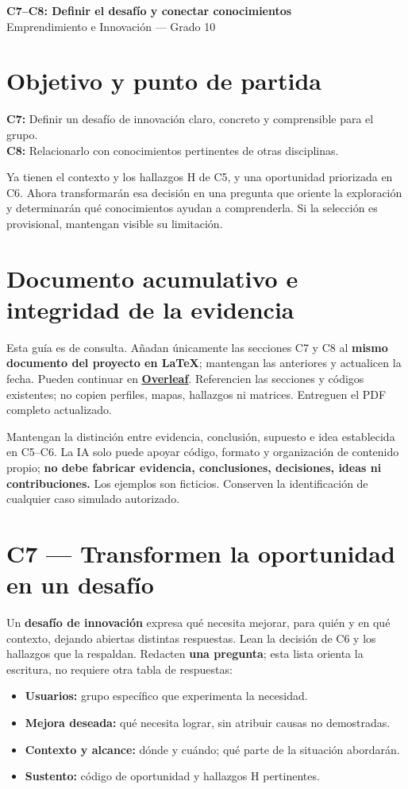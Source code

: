 \documentclass[12pt,a4paper]{article}
\newcommand{\guidelink}[2]{\href{#1}{\textcolor{LinkColor}{\textbf{\underline{#2}}}}}
\newcommand{\instruction}[1]{\textcolor{InstructionColor}{\textbf{#1}}}
\newcommand{\concept}[1]{\textcolor{ConceptColor}{\textbf{#1}}}
\begin{document}
\begin{center}
{\Large\bfseries\color{HeadingColor} C7--C8: Definir el desafío y conectar conocimientos}\\[3pt]
Emprendimiento e Innovación --- Grado 10
\end{center}

\section*{Objetivo y punto de partida}
\concept{C7:} Definir un desafío de innovación claro, concreto y comprensible para el grupo.\\
\concept{C8:} Relacionarlo con conocimientos pertinentes de otras disciplinas.

Ya tienen el contexto y los hallazgos H de C5, y una oportunidad priorizada en C6. Ahora transformarán esa decisión en una pregunta que oriente la exploración y determinarán qué conocimientos ayudan a comprenderla. Si la selección es provisional, mantengan visible su limitación.

\section*{Documento acumulativo e integridad de la evidencia}
Esta guía es de consulta. Añadan únicamente las secciones C7 y C8 al \textbf{mismo documento del proyecto en LaTeX}; mantengan las anteriores y actualicen la fecha. Pueden continuar en \guidelink{https://www.overleaf.com/}{Overleaf}. Referencien las secciones y códigos existentes; no copien perfiles, mapas, hallazgos ni matrices. Entreguen el PDF completo actualizado.

Mantengan la distinción entre evidencia, conclusión, supuesto e idea establecida en C5--C6. La IA solo puede apoyar código, formato y organización de contenido propio; \instruction{no debe fabricar evidencia, conclusiones, decisiones, ideas ni contribuciones.} Los ejemplos son ficticios. Conserven la identificación de cualquier caso simulado autorizado.

\section*{C7 --- Transformen la oportunidad en un desafío}
Un \concept{desafío de innovación} expresa qué necesita mejorar, para quién y en qué contexto, dejando abiertas distintas respuestas. Lean la decisión de C6 y los hallazgos que la respaldan. Redacten \textbf{una pregunta}; esta lista orienta la escritura, no requiere otra tabla de respuestas:
\begin{itemize}
\item \textbf{Usuarios:} grupo específico que experimenta la necesidad.
\item \textbf{Mejora deseada:} qué necesita lograr, sin atribuir causas no demostradas.
\item \textbf{Contexto y alcance:} dónde y cuándo; qué parte de la situación abordarán.
\item \textbf{Sustento:} código de oportunidad y hallazgos H pertinentes.
\end{itemize}
\end{document}
